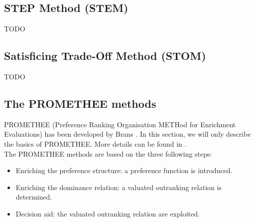 \subsection{STEP Method (STEM)}
TODO

\subsection{Satisficing Trade-Off Method (STOM)}
TODO

\subsection{The PROMETHEE methods}
PROMETHEE (Preference Ranking Organisation METHod for Enrichment Evaluations) has been developed by Brans \cite{Brans1}. In this section, we will only describe the basics of PROMETHEE. More details can be found in \cite{Beh2010}.\\
The PROMETHEE methods are based on the three following steps:
\begin{itemize}
\item Enriching the preference structure: a preference function is introduced.
\item Enriching the dominance relation: a valuated outranking relation is determined.
\item Decision aid: the valuated outranking relation are exploited.
\end{itemize}

